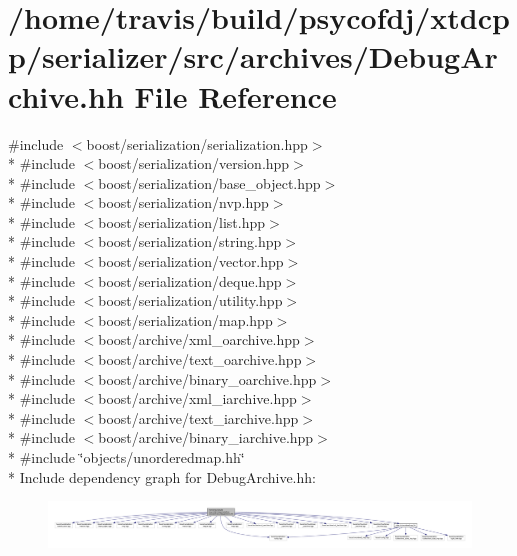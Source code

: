 \hypertarget{DebugArchive_8hh}{\section{/home/travis/build/psycofdj/xtdcpp/serializer/src/archives/\-Debug\-Archive.hh File Reference}
\label{DebugArchive_8hh}
}
{\ttfamily \#include $<$boost/serialization/serialization.\-hpp$>$}\\*
{\ttfamily \#include $<$boost/serialization/version.\-hpp$>$}\\*
{\ttfamily \#include $<$boost/serialization/base\-\_\-object.\-hpp$>$}\\*
{\ttfamily \#include $<$boost/serialization/nvp.\-hpp$>$}\\*
{\ttfamily \#include $<$boost/serialization/list.\-hpp$>$}\\*
{\ttfamily \#include $<$boost/serialization/string.\-hpp$>$}\\*
{\ttfamily \#include $<$boost/serialization/vector.\-hpp$>$}\\*
{\ttfamily \#include $<$boost/serialization/deque.\-hpp$>$}\\*
{\ttfamily \#include $<$boost/serialization/utility.\-hpp$>$}\\*
{\ttfamily \#include $<$boost/serialization/map.\-hpp$>$}\\*
{\ttfamily \#include $<$boost/archive/xml\-\_\-oarchive.\-hpp$>$}\\*
{\ttfamily \#include $<$boost/archive/text\-\_\-oarchive.\-hpp$>$}\\*
{\ttfamily \#include $<$boost/archive/binary\-\_\-oarchive.\-hpp$>$}\\*
{\ttfamily \#include $<$boost/archive/xml\-\_\-iarchive.\-hpp$>$}\\*
{\ttfamily \#include $<$boost/archive/text\-\_\-iarchive.\-hpp$>$}\\*
{\ttfamily \#include $<$boost/archive/binary\-\_\-iarchive.\-hpp$>$}\\*
{\ttfamily \#include \char`\"{}objects/unorderedmap.\-hh\char`\"{}}\\*
Include dependency graph for Debug\-Archive.\-hh\-:
\nopagebreak
\begin{figure}[H]
\begin{center}
\leavevmode
\includegraphics[width=350pt]{DebugArchive_8hh__incl}
\end{center}
\end{figure}
